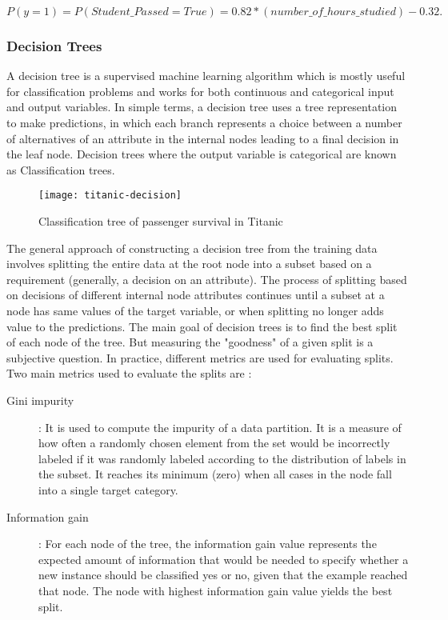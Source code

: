 \documentclass[11pt,openright]{report}
\begin{document}
\begin{equation}
 P(y=1) = P(Student\_Passed= True) = 0.82 * (number\_of\_hours\_studied) -0.32.  \label{eq:logisticExample} 
 \end{equation}

\subsubsection {Decision Trees}

A decision tree is a supervised machine learning algorithm which is mostly useful for classification problems and works for both continuous and categorical input and output variables. In simple terms, a decision tree uses a tree representation to make predictions, in which each branch represents a choice between a number of alternatives of an attribute in the internal nodes leading to a final decision in the leaf node. Decision trees where the output variable is categorical are known as Classification trees.

  \begin{figure}
	\centering
	\texttt{[image: titanic-decision]}
	\caption{Classification tree of passenger survival in Titanic}
	\label{fig:classification_tree_titanic}
\end{figure} 

The general approach of constructing a decision tree from the training data involves splitting the entire data at the root node into a subset based on a requirement (generally, a decision on an attribute). The process of splitting based on decisions of different internal node attributes continues until a subset at a node has same values of the target variable, or when splitting no longer adds value to the predictions. The main goal of decision trees is to find the best split of each node of the tree. But measuring the "goodness" of a given split is a subjective question. In practice, different metrics are used for evaluating splits. Two main metrics used to evaluate the splits are :
\begin{description}
    \item[Gini impurity] : It is used to compute the impurity of a data partition. It is a measure of how often a randomly chosen element from the set would be incorrectly labeled if it was randomly labeled according to the distribution of labels in the subset. It reaches its minimum (zero) when all cases in the node fall into a single target category. 

    \item[Information gain] : For each node of the tree, the information gain value represents the expected amount of information that would be needed to specify whether a new instance should be classified yes or no, given that the example reached that node. The node with highest information gain value yields the best split. 
     
 \end{description}
 
\end{document}
